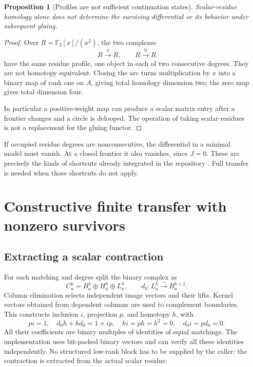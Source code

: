\documentclass[11pt]{article}
\newtheorem{proposition}[theorem]{Proposition}
\theoremstyle{definition}\newtheorem{definition}[theorem]{Definition}
\theoremstyle{remark}\newtheorem{remark}[theorem]{Remark}
\newcommand{\F}{{\mathbb F_2}}
\begin{document}
\begin{proposition}[Profiles are not sufficient continuation states]\label{prop:notstate}
Scalar-residue homology alone does not determine the surviving differential or
its behavior under subsequent gluing.
\end{proposition}
\begin{proof}
Over $R=\F[x]/(x^2)$, the two complexes
\[
 R\xrightarrow{x}R,\qquad R\xrightarrow{0}R
\]
have the same residue profile, one object in each of two consecutive degrees.
They are not homotopy equivalent. Closing the arc turns multiplication by $x$
into a binary map of rank one on $A$, giving total homology dimension two;
the zero map gives total dimension four.

In particular a positive-weight map can produce a scalar matrix entry after a
frontier changes and a circle is delooped. The operation of taking scalar
residues is not a replacement for the gluing functor.
\end{proof}

If occupied residue degrees are nonconsecutive, the differential in a minimal
model must vanish. At a closed frontier it also vanishes, since $J=0$. These
are precisely the kinds of shortcuts already integrated in the repository
\cite{RepoRadical}. Full transfer is needed when those shortcuts do not apply.

\section{Constructive finite transfer with nonzero survivors}
\label{sec:transfer}
\subsection{Extracting a scalar contraction}
For each matching and degree split the binary complex as
\[
 C^h_a=B^h_a\oplus H^h_a\oplus L^h_a,
 \qquad d_0:L^h_a\overset{\sim}{\longrightarrow}B^{h+1}_a.
\]
Column elimination selects independent image vectors and their lifts. Kernel
vectors obtained from dependent columns are used to complement boundaries.
This constructs inclusion $i$, projection $p$, and homotopy $h$, with
\begin{equation}\label{eq:sdr0}
 pi=1,\quad d_0h+hd_0=1+ip,\quad hi=ph=h^2=0,\quad d_0i=pd_0=0.
\end{equation}
All their coefficients are binary multiples of identities of equal matchings.
The implementation uses bit-packed binary vectors and can verify all these
identities independently. No structured low-rank block has to be supplied by
the caller: the contraction is extracted from the actual scalar residue.
\end{document}
